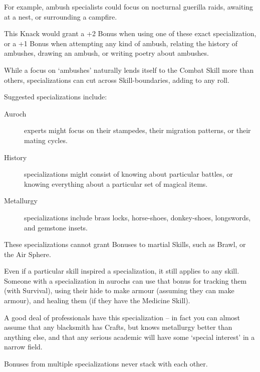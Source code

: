 \begin{multicols}{2}
For example, ambush specialists could focus on nocturnal guerilla raids, awaiting at a nest, or surrounding a campfire.

This Knack would grant a +2 Bonus when using one of these exact specialization, or a +1 Bonus when attempting any kind of ambush, relating the history of ambushes, drawing an ambush, or writing poetry about ambushes.

While a focus on `ambushes' naturally lends itself to the Combat Skill more than others, specializations can cut across Skill-boundaries, adding to any roll.

Suggested specializations include:

\begin{description}
  \item[Auroch]
  experts might focus on their stampedes, their migration patterns, or their mating cycles.
  \item[History]
  specializations might consist of knowing about particular battles, or knowing everything about a particular set of magical items.
  \item[Metallurgy]
  specializations include brass locks, horse-shoes, donkey-shoes, longswords, and gemstone insets.
\end{description}

These specializations cannot grant Bonuses to martial Skills, such as Brawl, or the Air Sphere.

Even if a particular skill inspired a specialization, it still applies to any skill.
Someone with a specialization in aurochs can use that bonus for tracking them (with Survival), using their hide to make armour (assuming they can make armour), and healing them (if they have the Medicine Skill).

A good deal of professionals have this specialization -- in fact you can almost assume that any blacksmith has Crafts, but knows metallurgy better than anything else, and that any serious academic will have some `special interest' in a narrow field.

Bonuses from multiple specializations never stack with each other.

\end{multicols}
